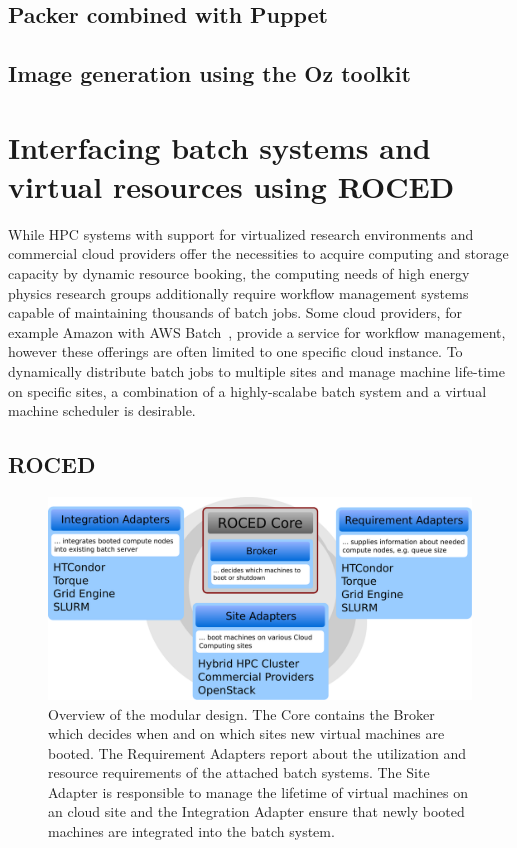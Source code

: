 \subsection{Packer combined with Puppet}





\subsection{Image generation using the Oz toolkit}





\section{Interfacing batch systems and virtual resources using ROCED}
\label{section:roced}
While HPC systems with support for virtualized research environments and commercial cloud providers offer the
necessities to acquire computing and storage capacity by dynamic
resource booking, the computing needs of high energy physics
re\-search groups ad\-di\-tion\-al\-ly require work\-flow
ma\-na\-ge\-ment sys\-tems capable of maintaining thousands of batch
jobs. Some cloud providers, for example Amazon with AWS
Batch~\cite{awsbatch}, provide a service for workflow management,
however these offerings are often limited to one specific cloud instance. To dynamically distribute batch jobs to multiple sites and manage machine life-time on specific sites, a combination of a highly-scalabe batch system and a virtual machine scheduler is desirable.

\subsection{ROCED}
\begin{figure}
\begin{center}
  \includegraphics[width=0.9\linewidth]{figures/roced_design_flat.pdf}
  \caption{Overview of the \Roced modular design. The  \Roced Core contains the Broker which decides when and on which sites new virtual machines are booted. The Requirement Adapters report about the utilization and resource requirements of the attached batch systems. The Site Adapter is responsible to manage the lifetime of virtual machines on an cloud site and the Integration Adapter ensure that newly booted machines are integrated into the batch system.}
  \label{fig-roced}
\end{center}
\end{figure}

